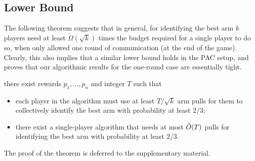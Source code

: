 





\subsection{Lower Bound} \label{sec:lower bound}


The following theorem suggests that in general, for identifying the best arm $k$ players need at least $\tilde{\Omega}(\sqrt{k})$ times the budget required for a single player to do so, when only allowed one round of communication (at the end of the game). 
Clearly, this also implies that a similar lower bound holds in the PAC setup, and proves that our algorithmic results for the one-round case are essentially tight.    


\begin{theorem} \label{thm:lb1}
there exist rewards $p_1,\ldots,p_n$ and integer $T$ such that
\begin{itemize}
\item
each player in the algorithm must use at least $T/\sqrt{k}$ arm pulls for
them to collectively identify the best arm with probability at least $2/3$;
\item
there exist a single-player algorithm that needs at most $\tilde{O}(T)$ pulls for
identifying the best arm with probability at least $2/3$.
\end{itemize}
\end{theorem}


The proof of the theorem is deferred to the supplementary material.


